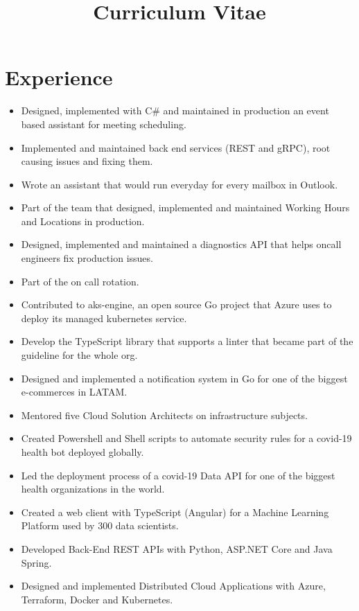 \documentclass[10pt, a4paper, roman]{moderncv} %
\title{Curriculum Vitae}
\begin{document}
\makecvtitle %

\section{Experience}

{
    \begin{itemize}
	    \item Designed, implemented with C\# and maintained in production an event based assistant for meeting scheduling.
        \item Implemented and maintained back end services (REST and gRPC), root causing issues and fixing them.
        \item Wrote an assistant that would run everyday for every mailbox in Outlook.
	    \item Part of the team that designed, implemented and maintained Working Hours and Locations in production.
        \item Designed, implemented and maintained a diagnostics API that helps oncall engineers fix production issues.
        \item Part of the on call rotation.
    \end{itemize}
}

{
    \begin{itemize}
	    \item Contributed to aks-engine, an open source Go project that Azure uses to deploy its managed kubernetes service. 
	    \item Develop the TypeScript library that supports a linter that became part of the guideline for the whole org.
        \item Designed and implemented a notification system in Go for one of the biggest e-commerces in LATAM.
        \item Mentored five Cloud Solution Architects on infrastructure subjects.
        \item Created Powershell and Shell scripts to automate security rules for a covid-19 health bot deployed globally.
        \item Led the deployment process of a covid-19 Data API for one of the biggest health organizations in the world.
    \end{itemize}
}

{
    \begin{itemize}
        \item Created a web client with TypeScript (Angular) for a Machine Learning Platform used by 300 data scientists.
        \item Developed Back-End REST APIs with Python, ASP.NET Core and Java Spring.
	    \item Designed and implemented Distributed Cloud Applications with Azure, Terraform, Docker and Kubernetes.
    \end{itemize}
}
\end{document}
